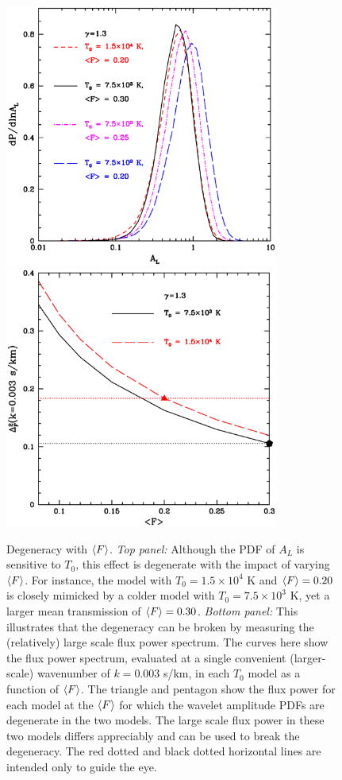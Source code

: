 \begin{figure}[t]
\includegraphics[width=9cm]{f12a.eps}
\includegraphics[width=9cm]{f12b.eps}
\caption{Degeneracy with $\langle F \rangle$. {\it Top panel:} Although the PDF of $A_L$ is sensitive
to $T_0$, this effect is degenerate with the impact of varying $\langle F \rangle$. For instance, the model with $T_0 = 1.5 \times 10^4$ K
and $\langle F \rangle = 0.20$ is closely mimicked by a colder model with $T_0=7.5 \times 10^3$ K, yet a larger mean transmission of
$\langle F \rangle = 0.30$. {\it Bottom panel:} This illustrates that the degeneracy can be broken by measuring the (relatively) large
scale flux power spectrum. The curves here show the flux power spectrum, evaluated at a single convenient (larger-scale) wavenumber of $k=0.003$ s/km, 
in each $T_0$ model as a function of $\langle F \rangle$. The triangle and pentagon show the flux power for each model at the
$\langle F \rangle$ for which the wavelet amplitude PDFs are degenerate in the two models. The large scale flux power in these
two models differs appreciably and can be used to break the degeneracy. The red dotted and black dotted horizontal lines are intended 
only to guide the eye.}
\label{fig:degen_break}
\end{figure}


